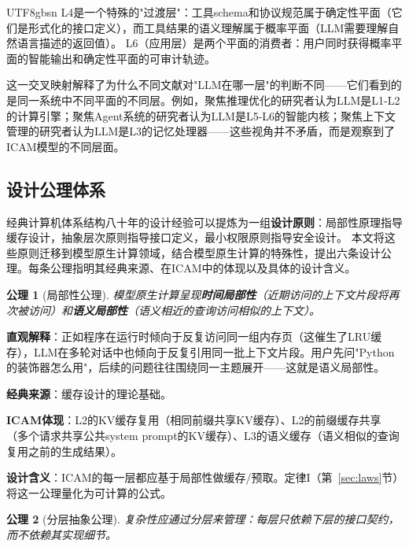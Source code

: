\documentclass[11pt,a4paper]{article}
\newtheorem{axiom}{公理}[section]
\begin{document}
\begin{CJK*}{UTF8}{gbsn}
L4是一个特殊的"过渡层"：工具schema和协议规范属于确定性平面（它们是形式化的接口定义），而工具结果的语义理解属于概率平面（LLM需要理解自然语言描述的返回值）。
L6（应用层）是两个平面的消费者：用户同时获得概率平面的智能输出和确定性平面的可审计轨迹。

这一交叉映射解释了为什么不同文献对"LLM在哪一层"的判断不同——它们看到的是同一系统中不同平面的不同层。例如，聚焦推理优化的研究者认为LLM是L1-L2的计算引擎\cite{kwon2023pagedattention,zhou2024efficientinference}；聚焦Agent系统的研究者认为LLM是L5-L6的智能内核\cite{openai_codex_overview_2026,anthropic_claudecode_overview_2026}；聚焦上下文管理的研究者认为LLM是L3的记忆处理器\cite{memgpt2023,memoryos2025}——这些视角并不矛盾，而是观察到了ICAM模型的不同层面。

\subsection{设计公理体系}
\label{sec:icam-axioms}

经典计算机体系结构八十年的设计经验可以提炼为一组\textbf{设计原则}：局部性原理指导缓存设计，抽象层次原则指导接口定义，最小权限原则指导安全设计。
本文将这些原则迁移到模型原生计算领域，结合模型原生计算的特殊性，提出六条设计公理。每条公理指明其经典来源、在ICAM中的体现以及具体的设计含义。

\begin{axiom}[局部性公理]
模型原生计算呈现\textbf{时间局部性}（近期访问的上下文片段将再次被访问）和\textbf{语义局部性}（语义相近的查询访问相似的上下文）。
\end{axiom}

\textbf{直观解释}：正如程序在运行时倾向于反复访问同一组内存页（这催生了LRU缓存），LLM在多轮对话中也倾向于反复引用同一批上下文片段。用户先问"Python的装饰器怎么用"，后续的问题往往围绕同一主题展开——这就是语义局部性。

\textbf{经典来源}：缓存设计的理论基础\cite{drepper2007memory}。

\textbf{ICAM体现}：L2的KV缓存复用（相同前缀共享KV缓存）、L2的前缀缓存共享（多个请求共享公共system prompt的KV缓存）、L3的语义缓存（语义相似的查询复用之前的生成结果）。

\textbf{设计含义}：ICAM的每一层都应基于局部性做缓存/预取。定律I（第~\ref{sec:laws}节）将这一公理量化为可计算的公式。

\begin{axiom}[分层抽象公理]
复杂性应通过分层来管理：每层只依赖下层的接口契约，而不依赖其实现细节。
\end{axiom}


\end{CJK*}
\end{document}
